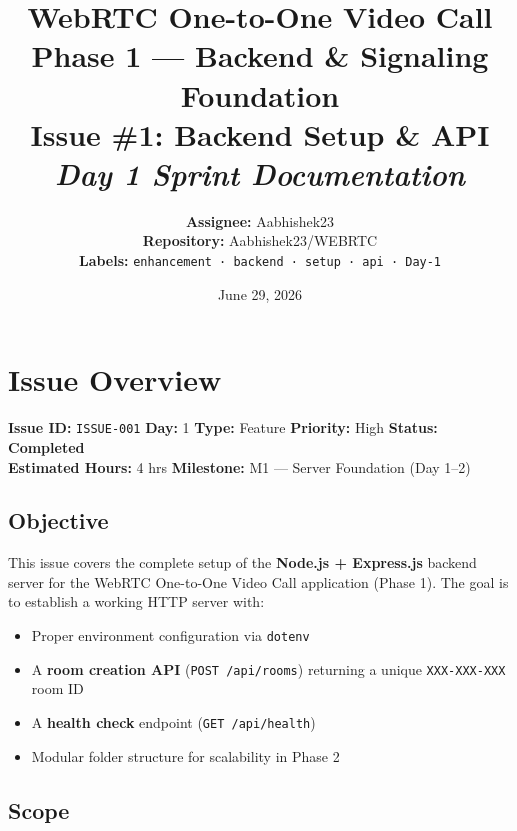 \documentclass[11pt,a4paper]{article}
\title{
    \vspace{1.5in}
    \Huge \textbf{WebRTC One-to-One Video Call} \\
    \Large Phase 1 --- Backend \& Signaling Foundation \\
    \vspace{0.5in}
    \huge \textbf{Issue \#1: Backend Setup \& API} \\
    \large \textit{Day 1 Sprint Documentation} \\
    \vspace{1.5in}
}
\author{
    \textbf{Assignee:} Aabhishek23 \\[0.3em]
    \textbf{Repository:} Aabhishek23/WEBRTC \\[0.3em]
    \textbf{Labels:} \texttt{enhancement · backend · setup · api · Day-1}
}
\date{June 29, 2026}
\begin{document}
\maketitle
\thispagestyle{empty}
\newpage

\tableofcontents
\newpage

\section{Issue Overview}

\begin{infoblock}
\textbf{Issue ID:} \texttt{ISSUE-001} \quad
\textbf{Day:} 1 \quad
\textbf{Type:} Feature \quad
\textbf{Priority:} High \quad
\textbf{Status:} \textcolor{successgreen}{\textbf{Completed}} \\[0.4em]
\textbf{Estimated Hours:} 4 hrs \quad
\textbf{Milestone:} M1 --- Server Foundation (Day 1--2)
\end{infoblock}

\vspace{0.5em}

\subsection{Objective}

This issue covers the complete setup of the \textbf{Node.js + Express.js} backend server for the WebRTC One-to-One Video Call application (Phase 1). The goal is to establish a working HTTP server with:

\begin{itemize}
    \item Proper environment configuration via \texttt{dotenv}
    \item A \textbf{room creation API} (\texttt{POST /api/rooms}) returning a unique \texttt{XXX-XXX-XXX} room ID
    \item A \textbf{health check} endpoint (\texttt{GET /api/health})
    \item Modular folder structure for scalability in Phase 2
\end{itemize}

\subsection{Scope}
\end{document}
